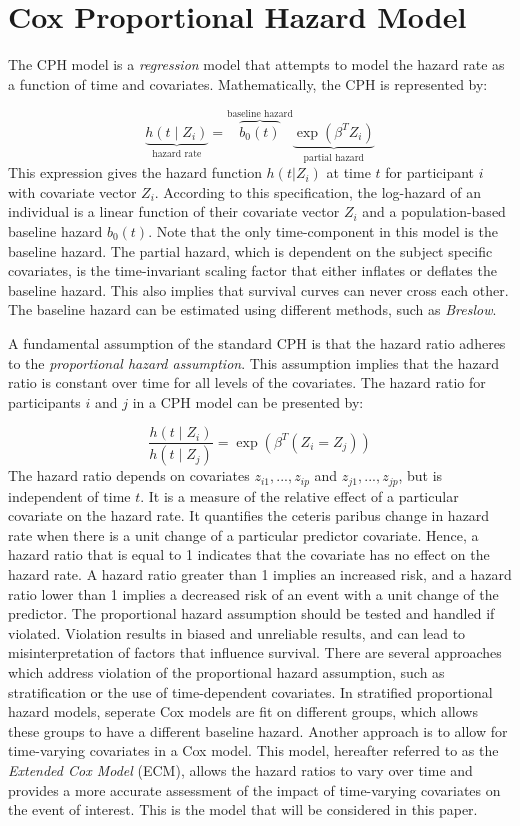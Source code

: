 \medskip
\section{Cox Proportional Hazard Model}
\label{section:methodology:CPH}
The CPH model is a \textit{regression} model that attempts to model the hazard rate as a function of time and covariates. Mathematically, the CPH is represented by: 

$$
\underbrace{h(t \mid Z_i)}_{\text{hazard rate}} = \overbrace{b_0(t)}^{\text{baseline hazard}} \underbrace{\exp (\beta^T Z_i)}_{\text{partial hazard}}
$$
This expression gives the hazard function $h(t|Z_i)$ at time $t$ for participant $i$ with covariate vector $Z_i$. According to this specification, the log-hazard of an individual is a linear function of their covariate vector $Z_i$ and a population-based baseline hazard $b_{0}(t)$. Note that the only time-component in this model is the baseline hazard. The partial hazard, which is dependent on the subject specific covariates, is the time-invariant scaling factor that either inflates or deflates the baseline hazard. This also implies that survival curves can never cross each other. The baseline hazard can be estimated using different methods, such as \textit{Breslow}. %

A fundamental assumption of the standard CPH is that the hazard ratio adheres to the \textit{proportional hazard assumption}. This assumption implies that the hazard ratio is constant over time for all levels of the covariates. The hazard ratio for participants $i$ and $j$ in a CPH model can be presented by: 

$$\frac{h(t \mid Z_i)}{h(t \mid Z_j)} = \exp(\beta^T (Z_i = Z_j))$$
The hazard ratio depends on covariates $z_{i1}, ..., z_{ip}$ and $z_{j1}, ..., z_{jp}$, but is independent of time $t$. It is a measure of the relative effect of a particular covariate on the hazard rate. It quantifies the ceteris paribus change in hazard rate when there is a unit change of a particular predictor covariate. Hence, a hazard ratio that is equal to 1 indicates that the covariate has no effect on the hazard rate. A hazard ratio greater than 1 implies an increased risk, and a hazard ratio lower than 1 implies a decreased risk of an event with a unit change of the predictor. The proportional hazard assumption should be tested and handled if violated. %
Violation results in biased and unreliable results, and can lead to misinterpretation of factors that influence survival. There are several approaches which address violation of the proportional hazard assumption, such as stratification or the use of time-dependent covariates. In stratified proportional hazard models, seperate Cox models are fit on different groups, which allows these groups to have a different baseline hazard. Another approach is to allow for time-varying covariates in a Cox model. This model, hereafter referred to as the \textit{Extended Cox Model} (ECM), allows the hazard ratios to vary over time and provides a more accurate assessment of the impact of time-varying covariates on the event of interest. This is the model that will be considered in this paper. 

